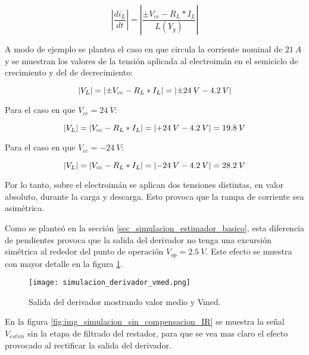 \begin{equation} \label{eq_Vbus-didt-RL}
	\left|\frac{di_L}{dt}\right|=\left|\frac{\pm V_{cc}-R_L*I_L}{L(Y_g)}\right|
\end{equation}

A modo de ejemplo se plantea el caso en que circula la corriente nominal de $21\:A$ y se muestran los valores de la tensión aplicada al electroimán en el semiciclo de crecimiento y del de decrecimiento:

\begin{equation} \label{eq_Vbus-didt-RL-2}
	\lvert V_L\rvert=\lvert\pm V_{cc}-R_L*I_L\rvert= \lvert\pm 24\:V-4.2\:V\rvert
\end{equation}

Para el caso en que $V_{cc}=24\:V$:

\begin{equation} \label{eq_Vbus-didt-RL-3}
	\lvert V_L\rvert=\lvert V_{cc}-R_L*I_L\rvert=\lvert+24\:V-4.2\:V\rvert= 19.8\:V
\end{equation}

Para el caso en que $V_{cc}=-24\:V$:

\begin{equation} \label{eq_Vbus-didt-RL-4}
	\lvert V_L\rvert=\lvert V_{cc}-R_L*I_L\rvert= \lvert-24\:V-4.2\:V\rvert= 28.2\:V
\end{equation}

Por lo tanto, sobre el electroimán se aplican dos tensiones distintas, en valor absoluto, durante la carga y descarga. Esto provoca que la rampa de corriente sea asimétrica.

Como se planteó en la sección \ref{sec_simulacion_estimador_basico}, esta diferencia de pendientes provoca que la salida del derivador no tenga una excursión simétrica al rededor del punto de operación $V_{op}=2.5\:V$. Este efecto se muestra con mayor detalle en la figura \ref{fig:img_simulacion_derivador_vmed}.

\begin{figure}[H]
	\centering
	\texttt{[image: simulacion\_derivador\_vmed.png]}
	\caption{Salida del derivador mostrando valor medio y Vmed.}
	\label{fig:img_simulacion_derivador_vmed}
\end{figure}

En la figura \ref{fig:img_simulacion_sin_compensacion_IR} se muestra la señal $V_{estim}$ sin la etapa de filtrado del restador, para que se vea mas claro el efecto provocado al rectificar la salida del derivador. 


